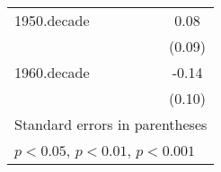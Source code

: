 {\begin{tabular}{l*{5}{c}}
\addlinespace
1950.decade&                  &                  &                  &                  &     0.08         \\
          &                  &                  &                  &                  &   (0.09)         \\
\addlinespace
1960.decade&                  &                  &                  &                  &    -0.14         \\
          &                  &                  &                  &                  &   (0.10)         \\
\bottomrule
\multicolumn{6}{l}{\footnotesize Standard errors in parentheses}\\
\multicolumn{6}{l}{\footnotesize \sym{*} \(p<0.05\), \sym{**} \(p<0.01\), \sym{***} \(p<0.001\)}\\
\end{tabular}
}
